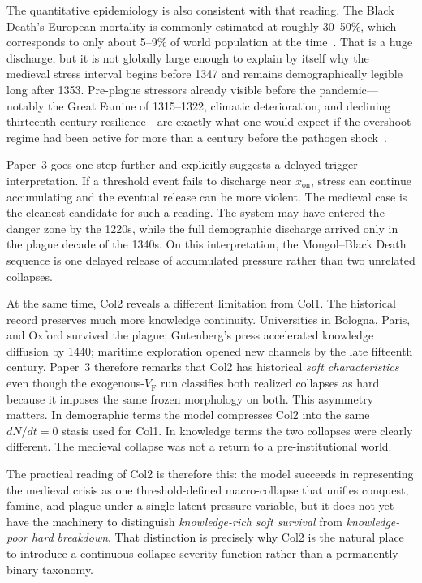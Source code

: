 \documentclass[11pt]{article}
\newcommand{\VF}{V_{\mathrm{F}}}
\newcommand{\xon}{x_{\mathrm{on}}}
\newcommand{\ColOne}{Col1}
\newcommand{\ColTwo}{Col2}
\begin{document}
The quantitative epidemiology is also consistent with that reading. The Black Death's European mortality is commonly estimated at roughly 30--50\%, which corresponds to only about 5--9\% of world population at the time~\cite{alfani2017}. That is a huge discharge, but it is not globally large enough to explain by itself why the medieval stress interval begins before 1347 and remains demographically legible long after 1353. Pre-plague stressors already visible before the pandemic---notably the Great Famine of 1315--1322, climatic deterioration, and declining thirteenth-century resilience---are exactly what one would expect if the overshoot regime had been active for more than a century before the pathogen shock~\cite{alfani2017}.

Paper~3 goes one step further and explicitly suggests a delayed-trigger interpretation. If a threshold event fails to discharge near $\xon$, stress can continue accumulating and the eventual release can be more violent. The medieval case is the cleanest candidate for such a reading. The system may have entered the danger zone by the 1220s, while the full demographic discharge arrived only in the plague decade of the 1340s. On this interpretation, the Mongol--Black Death sequence is one delayed release of accumulated pressure rather than two unrelated collapses.

At the same time, \ColTwo{} reveals a different limitation from \ColOne{}. The historical record preserves much more knowledge continuity. Universities in Bologna, Paris, and Oxford survived the plague; Gutenberg's press accelerated knowledge diffusion by 1440; maritime exploration opened new channels by the late fifteenth century. Paper~3 therefore remarks that \ColTwo{} has historical \emph{soft characteristics} even though the exogenous-$\VF$ run classifies both realized collapses as hard because it imposes the same frozen morphology on both. This asymmetry matters. In demographic terms the model compresses \ColTwo{} into the same $dN/dt=0$ stasis used for \ColOne{}. In knowledge terms the two collapses were clearly different. The medieval collapse was not a return to a pre-institutional world.

The practical reading of \ColTwo{} is therefore this: the model succeeds in representing the medieval crisis as one threshold-defined macro-collapse that unifies conquest, famine, and plague under a single latent pressure variable, but it does not yet have the machinery to distinguish \emph{knowledge-rich soft survival} from \emph{knowledge-poor hard breakdown}. That distinction is precisely why \ColTwo{} is the natural place to introduce a continuous collapse-severity function rather than a permanently binary taxonomy.
\end{document}
